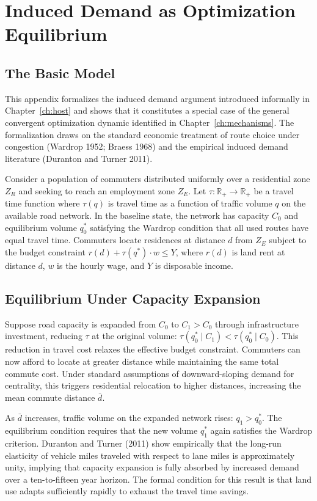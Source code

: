 \documentclass[12pt, oneside]{book}
\theoremstyle{plain}
\theoremstyle{definition}
\theoremstyle{remark}
\theoremstyle{definition}
\begin{document}
\chapter{Induced Demand as Optimization Equilibrium}
\label{app:induced}

\section{The Basic Model}

This appendix formalizes the induced demand argument introduced informally in
Chapter~\ref{ch:host} and shows that it constitutes a special case of the general
convergent optimization dynamic identified in Chapter~\ref{ch:mechanisms}. The
formalization draws on the standard economic treatment of route choice under
congestion (Wardrop 1952; Braess 1968) and the empirical induced demand literature
(Duranton and Turner 2011).

Consider a population of commuters distributed uniformly over a residential zone
$Z_R$ and seeking to reach an employment zone $Z_E$. Let $\tau: \mathbb{R}_+ \to
\mathbb{R}_+$ be a travel time function where $\tau(q)$ is travel time as a function
of traffic volume $q$ on the available road network. In the baseline state, the
network has capacity $C_0$ and equilibrium volume $q_0^*$ satisfying the Wardrop
condition that all used routes have equal travel time. Commuters locate residences
at distance $d$ from $Z_E$ subject to the budget constraint $r(d) + \tau(q^*) \cdot
w \leq Y$, where $r(d)$ is land rent at distance $d$, $w$ is the hourly wage, and
$Y$ is disposable income.

\section{Equilibrium Under Capacity Expansion}

Suppose road capacity is expanded from $C_0$ to $C_1 > C_0$ through infrastructure
investment, reducing $\tau$ at the original volume: $\tau(q_0^* \mid C_1) < \tau(q_0^*
\mid C_0)$. This reduction in travel cost relaxes the effective budget constraint.
Commuters can now afford to locate at greater distance while maintaining the same
total commute cost. Under standard assumptions of downward-sloping demand for
centrality, this triggers residential relocation to higher distances, increasing
the mean commute distance $\bar{d}$.

As $\bar{d}$ increases, traffic volume on the expanded network rises: $q_1 >
q_0^*$. The equilibrium condition requires that the new volume $q_1^*$ again
satisfies the Wardrop criterion. Duranton and Turner (2011) show empirically that
the long-run elasticity of vehicle miles traveled with respect to lane miles is
approximately unity, implying that capacity expansion is fully absorbed by increased
demand over a ten-to-fifteen year horizon. The formal condition for this result is
that land use adapts sufficiently rapidly to exhaust the travel time savings.
\end{document}
